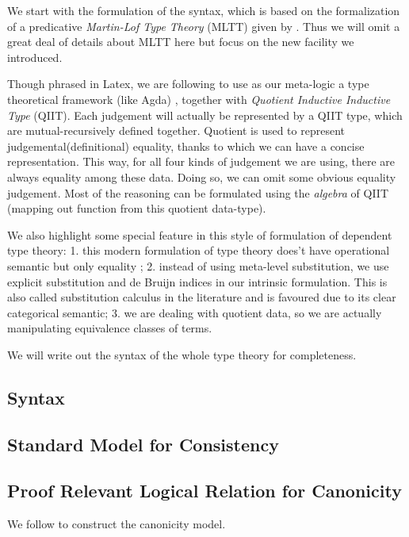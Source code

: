 
We start with the formulation of the syntax, which is based on the formalization of a predicative \textit{Martin-Lof Type Theory} (MLTT) given by \citep{coquand2018canonicity}. Thus we will omit a great deal of details about MLTT here but focus on the new facility we introduced. 

Though phrased in Latex, we are following \citep{kaposi2017type} to use as our meta-logic a type theoretical framework (like Agda) , 
together with \textit{Quotient Inductive Inductive Type} (QIIT). Each judgement will actually be represented by a QIIT type, which are mutual-recursively defined together. Quotient is used to represent judgemental(definitional) equality, thanks to which we can have a concise representation. This way, for all four kinds of judgement we are using, there are always equality among these data. Doing so, we can omit some obvious equality judgement. Most of the reasoning can be formulated using the \textit{algebra} of QIIT (mapping out function from this quotient data-type). 

We also highlight some special feature in this style of formulation of dependent type theory: 1. this modern formulation of type theory does't have operational semantic but only equality 
;
2. instead of using meta-level substitution, we use explicit substitution and de Bruijn indices in our intrinsic formulation. This is also called substitution calculus in the literature and is favoured due to its clear categorical semantic; 
3. we are dealing with quotient data, so we are actually manipulating equivalence classes of terms. 

We will write out the syntax of the whole type theory for completeness.


\newcommand{\denotes}[1]{{\llbracket {#1} \rrbracket}}
\newcommand{\denotesS}[1]{{{\llbracket {#1} \rrbracket}_S}}
\newcommand{\goodCtx}[2]{{ {#1} \ ok }}
\newcommand{\goodType}[3]{{ {#1} \vdash {#2} }}
\newcommand{\goodTerm}[3]{{ {#1} \vdash {#2} : {#3} }}
\newcommand{\goodSub}[3]{{ {#1} \vdash {#2} : {#3} }}
\newcommand{\goodSig}[3]{{ {#1} \vdash {#2} \ \  Sig^{#3} }}
\newcommand{\goodWSig}[3]{{ {#1} \vdash {#2} \ \ WSig^{#3} }}
\newcommand{\goodSeal}[4]{{ {#1} \vdash {#2} : {#3} \  |\  {#4} }}
\newcommand{\goodInh}[4]{{ {#1} \vdash {#2} : {#3} \twoheadrightarrow {#4}}}
\newcommand{\nat}{\mathbf{N}}

\newcommand{\cU}{{\mathcal{U}}}
\newcommand{\cB}{{\mathbb{B}}}
\newcommand{\cL}{{\mathcal{L}}}
\newcommand{\bW}{{\mathbb{W}}}



\subsection{Syntax}





\subsection{Standard Model for Consistency}




\subsection{Proof Relevant Logical Relation for Canonicity}
We follow \citep{sterling2019algebraic,coquand2018canonicity} to construct the canonicity model. 
